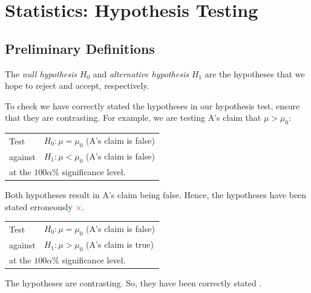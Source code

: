 \chapter{Statistics: Hypothesis Testing}
\section{Preliminary Definitions}
\begin{definition}{}{}
  The \emph{null hypothesis} \(H_0\) and \emph{alternative hypothesis} \(H_1\) are the hypotheses that we hope to reject and accept, respectively. 
\end{definition}
\begin{note}
  To check we have correctly stated the hypotheses in our hypothesis test, ensure that they are contrasting. For example, we are testing A's claim that \(\mu>\mu_0\):

  \begin{minipage}{0.45\textwidth}
    \vspace{\baselineskip}
    \begin{tabular}{|ll|}
      \hline
      Test & \(H_0\colon\mu=\mu_0\) (A's claim is false)\\
      against &\(H_1\colon\mu<\mu_0\) (A's claim is false)\\
      \multicolumn{2}{|l|}{at the \(100\alpha\%\) significance level.}\\
      \hline
    \end{tabular}

    \vspace{\baselineskip}
    Both hypotheses result in A's claim being false. Hence, the hypotheses have been stated erroneously \textcolor{red}{\(\times\)}.  
  \end{minipage}%
  \hfill
  \begin{minipage}{0.45\textwidth}
    \vspace{\baselineskip}
    \begin{tabular}{|ll|}
      \hline
      Test & \(H_0\colon\mu=\mu_0\) (A's claim is false)\\
      against &\(H_1\colon\mu>\mu_0\) (A's claim is true)\\
      \multicolumn{2}{|l|}{at the \(100\alpha\%\) significance level.}\\
      \hline 
    \end{tabular}  

    \vspace{\baselineskip}
    The hypotheses are contrasting. So, they have been correctly stated \textcolor{green!70!black}{\checkmark}. 
    \vspace{\baselineskip}
  \end{minipage}
\end{note}
